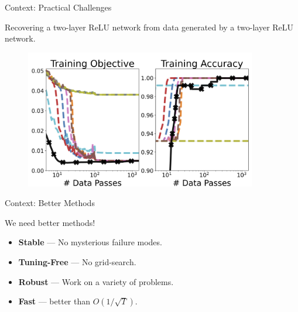 \documentclass[usenames,dvipsnames,mathserif,notheorems]{beamer}
\begin{document}
\begin{frame}{Context: Practical Challenges}

	\begin{center}
		\large
		Recovering a two-layer ReLU network from data generated by a two-layer ReLU network.
	\end{center}

	\pause

	\begin{figure}[]
		\centering
		\includegraphics[width=0.9\textwidth]{assets/synthetic_classification.png}
	\end{figure}
\end{frame}

\begin{frame}{Context: Better Methods}
	\begin{center}
		{ \Large
			We need better methods!
		}

	\end{center}
	\vspace{1em}
	\pause

	\begin{itemize}
		\item \textbf{Stable} --- No mysterious failure modes.\pause

		      \vspace{0.5em}
		\item \textbf{Tuning-Free} --- No grid-search.\pause

		      \vspace{0.5em}
		\item \textbf{Robust} --- Work on a variety of problems.\pause

		      \vspace{0.5em}
		\item \textbf{Fast} --- better than \( O(1/\sqrt{T}) \).
	\end{itemize}
\end{frame}
\end{document}
